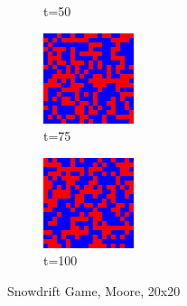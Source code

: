 \documentclass[a4paper, 11pt]{article}
\begin{document}
\begin{figure}[H]
\begin{subfigure}{.25\textwidth}
  \caption{t=50}
\end{subfigure}%
\begin{subfigure}{.25\textwidth}
  \centering
  \includegraphics[width=0.9\linewidth]{SNOWDRIFT_MOORE_20x20_t75}
  \caption{t=75}
\end{subfigure}%
\begin{subfigure}{.25\textwidth}
  \centering
  \includegraphics[width=0.9\linewidth]{SNOWDRIFT_MOORE_20x20_t100}
  \caption{t=100}
\end{subfigure}
\caption{Snowdrift Game, Moore, 20x20}
\end{figure}
\end{document}
